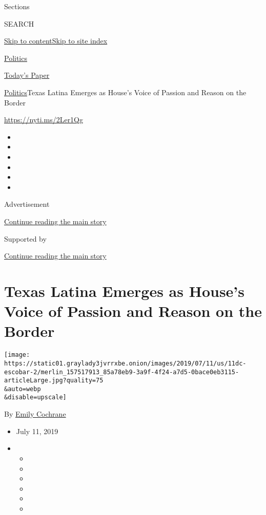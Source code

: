 Sections

SEARCH

\protect\hyperlink{site-content}{Skip to
content}\protect\hyperlink{site-index}{Skip to site index}

\href{https://www.nytimes3xbfgragh.onion/section/politics}{Politics}

\href{https://myaccount.nytimes3xbfgragh.onion/auth/login?response_type=cookie\&client_id=vi}{}

\href{https://www.nytimes3xbfgragh.onion/section/todayspaper}{Today's
Paper}

\href{/section/politics}{Politics}\textbar{}Texas Latina Emerges as
House's Voice of Passion and Reason on the Border

\url{https://nyti.ms/2Ler1Qg}

\begin{itemize}
\item
\item
\item
\item
\item
\item
\end{itemize}

Advertisement

\protect\hyperlink{after-top}{Continue reading the main story}

Supported by

\protect\hyperlink{after-sponsor}{Continue reading the main story}

\hypertarget{texas-latina-emerges-as-houses-voice-of-passion-and-reason-on-the-border}{%
\section{Texas Latina Emerges as House's Voice of Passion and Reason on
the
Border}\label{texas-latina-emerges-as-houses-voice-of-passion-and-reason-on-the-border}}

\texttt{[image: https://static01.graylady3jvrrxbe.onion/images/2019/07/11/us/11dc-escobar-2/merlin\_157517913\_85a78eb9-3a9f-4f24-a7d5-0bace0eb3115-articleLarge.jpg?quality=75\\\&auto=webp\\\&disable=upscale]}

By \href{https://www.nytimes3xbfgragh.onion/by/emily-cochrane}{Emily
Cochrane}

\begin{itemize}
\item
  July 11, 2019
\item
  \begin{itemize}
  \item
  \item
  \item
  \item
  \item
  \item
  \end{itemize}
\end{itemize}

